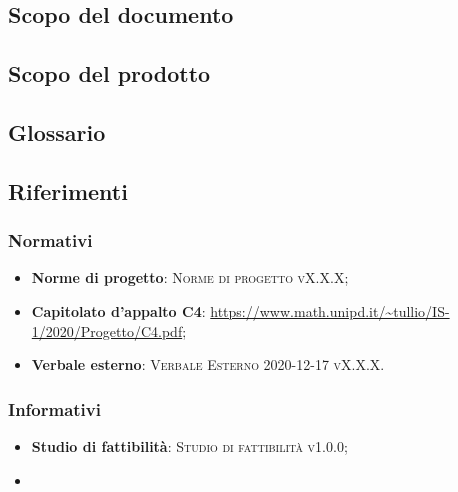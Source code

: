 \documentclass[../analisi-dei-requisiti.tex]{subfiles}
\begin{document}
\subsection{Scopo del documento}%
\label{subs:scopo_del_documento}


\subsection{Scopo del prodotto}%
\label{subs:scopo_del_prodotto}


\subsection{Glossario}
\label{subs:glossario}


\subsection{Riferimenti}
\label{subs:riferimenti}

\subsubsection{Normativi}%
\label{sssec:normativi}


\begin{itemize}
  \item \textbf{Norme di progetto}: \textsc{Norme di progetto vX.X.X};
  \item \textbf{Capitolato d'appalto C4}: \url{https://www.math.unipd.it/~tullio/IS-1/2020/Progetto/C4.pdf};
  \item \textbf{Verbale esterno}: \textsc{Verbale Esterno 2020-12-17 vX.X.X}.
\end{itemize}

\subsubsection{Informativi}%
\label{sssec:informativi}
\begin{itemize}
  \item \textbf{Studio di fattibilità}: \textsc{Studio di fattibilità v1.0.0};
  \item 
\end{itemize}
\end{document}
